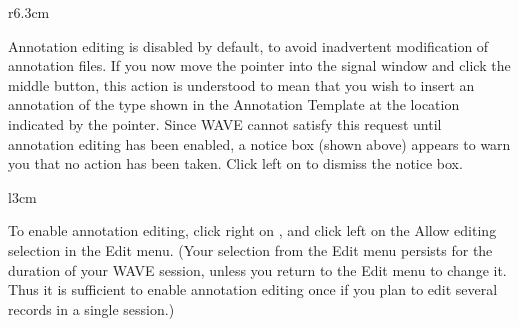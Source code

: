 \documentclass[twoside]{book}
\newcommand{\button}[1]{\cornersize{2}\ovalbox{\rule[-.3mm]{0cm}{2.5mm}\small\sf ~#1~}}
\newcommand{\menubutton}[1]{\button{#1~\ensuremath{\nabla}}}
\newcommand{\WAVE}{{\sf WAVE}\xspace}
\begin{document}
\begin{wrapfigure}[8]{r}{6.3cm}
\mbox{}
\end{wrapfigure}
Annotation editing
is disabled by default, to avoid inadvertent modification
of annotation files.  If you now move the pointer into the signal window and
click the middle button, this action is understood to mean that you wish to
insert an annotation of the type shown in the {\sf Annotation Template} at the
location indicated by the pointer.  Since \WAVE{} cannot satisfy this
request until annotation editing has been enabled, a notice box (shown above)
appears to warn you that no
action has been taken.  Click left on \button{Continue} to dismiss the
notice box.

\begin{wrapfigure}{l}{3cm}
\mbox{}
\begin{htmlonly}
\end{htmlonly}
\begin{latexonly}
\end{latexonly}
\end{wrapfigure}
To enable annotation editing, click right on \menubutton{Edit},
and click left on the {\sf Allow editing} selection in the {\sf Edit}
menu.  (Your selection from the {\sf Edit} menu persists for the duration of
your {\sf WAVE} session, unless you return to the {\sf Edit} menu to change
it.  Thus it is sufficient to enable annotation editing once if you plan to
edit several records in a single session.)
\end{document}
